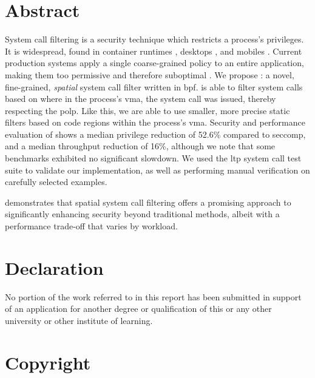 \section*{Abstract}


System call filtering is a security technique which restricts a process's
privileges. It is widespread, found in container runtimes 
\cite{docker_seccomp}, desktops \cite{chromium_sandboxing,
firefox_seccomp}, and mobiles \cite{android_seccomp_oreo}. Current
production systems apply a single coarse-grained policy to
an entire application, making them too permissive and therefore suboptimal
\cite{OPTIMUS}. 
We propose \af: a novel, fine-grained, \textit{spatial} system call filter
written in \ac{bpf}. \af is able to filter system calls based on where in
the process's \ac{vma}, the system call was issued, thereby respecting the 
\ac{polp}\cite{SALTZER_SCHROEDER}. Like this, we are able to use smaller, 
more precise static filters based on code regions within the process's \ac{vma}.
Security and performance evaluation of \af shows a median
privilege
reduction of 52.6\% compared to seccomp, and a median throughput reduction
of 16\%, although we note that some benchmarks exhibited no significant
slowdown. We used the \ac{ltp} system call test suite to validate our
implementation, as well as performing manual verification on carefully
selected examples.

\af demonstrates that spatial system call filtering offers a promising
approach to significantly enhancing security beyond traditional methods, albeit
with a performance trade-off that varies by workload.

\clearpage

\section*{Declaration}

No portion of the work referred to in this report has been
submitted in support of an application for another degree or
qualification of this or any other university or other institute
of learning.

\clearpage

\section*{Copyright}

